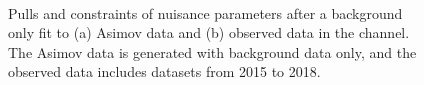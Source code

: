 \begin{figure}[!ht]
\begin{center}
\\
\caption{Pulls and constraints of nuisance parameters after a background only fit to (a) Asimov data and (b) observed data in the \llll channel.
The Asimov data is generated with background data only, and the observed data includes datasets from 2015 to 2018.
}
\label{fig:NPpull_cb_asimov}
\end{center}
\end{figure}

